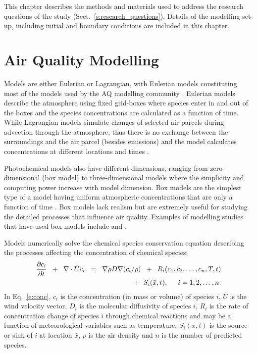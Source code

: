 This chapter describes the methods and materials used to address the research questions of the study (Sect.~\ref{s:research_questions}).
Details of the modelling set-up, including initial and boundary conditions are included in this chapter.

\section{Air Quality Modelling} \label{s:modelling}
Models are either Eulerian or Lagrangian, with Eulerian models constituting most of the models used by the AQ modelling community \citep{Russell:2000}.
Eulerian models describe the atmosphere using fixed grid-boxes where species enter in and out of the boxes and the species concentrations are calculated as a function of time. 
While Lagrangian models simulate changes of selected air parcels during advection through the atmosphere, thus there is no exchange between the surroundings and the air parcel (besides emissions) and the model calculates concentrations at different locations and times \citep{Seinfeld:2006}. 

Photochemical models also have different dimensions, ranging from zero-dimensional (box model) to three-dimensional models where the simplicity and computing power increase with model dimension.
Box models are the simplest type of a model having uniform atmospheric concentrations that are only a function of time \citep{Seinfeld:2006}.
Box models lack realism but are extremely useful for studying the detailed processes that influence air quality.
Examples of modelling studies that have used box models include \citet{Bin:2007} and \citet{Noelscher:2014}.

Models numerically solve the chemical species conservation equation describing the processes affecting the concentration of chemical species:
\begin{equation} \label{e:conc}
    \begin{split}
        \frac{\partial c_i}{\partial t} \hspace{2mm} + \hspace{2mm} \nabla \cdot \bar{U}c_i \hspace{2mm} = \hspace{2mm} \nabla \rho D \nabla(c_i/\rho) \hspace{2mm} + \hspace{2mm} R_i(c_1, c_2, \dots, c_n, T, t) \\ + \hspace{2mm} S_i(\bar{x}, t), \hspace{5mm} i = 1, 2, \dots, n.
    \end{split}
\end{equation}
In Eq.~\eqref{e:conc}, $c_i$ is the concentration (in mass or volume) of species $i$, $\bar{U}$ is the wind velocity vector, $D_i$ is the molecular diffusivity of species $i$, $R_i$ is the rate of concentration change of species $i$ through chemical reactions and may be a function of meteorological variables such as temperature.
$S_i(\bar{x}, t)$ is the source or sink of $i$ at location $\bar{x}$, $\rho$ is the air density and $n$ is the number of predicted species.
\citep{Russell:2000}

